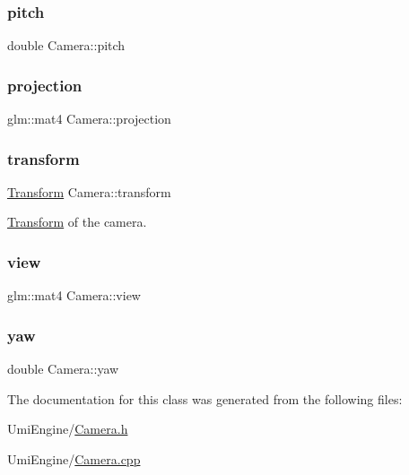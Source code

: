\subsubsection{\texorpdfstring{pitch}{pitch}}
{\footnotesize\ttfamily double Camera\+::pitch\hspace{0.3cm}{\ttfamily [protected]}}

\mbox{\label{class_camera_a43555a0ae83f9ec696ee257e5fd48cf2}} 
\subsubsection{\texorpdfstring{projection}{projection}}
{\footnotesize\ttfamily glm\+::mat4 Camera\+::projection\hspace{0.3cm}{\ttfamily [protected]}}

\mbox{\label{class_camera_ad5cea63239e1519c1fe7d414f5e047a8}} 
\subsubsection{\texorpdfstring{transform}{transform}}
{\footnotesize\ttfamily \mbox{\hyperlink{class_transform}{Transform}} Camera\+::transform}



\mbox{\hyperlink{class_transform}{Transform}} of the camera. 

\mbox{\label{class_camera_add93fedd6b9a6a6e2c784aeda624de83}} 
\subsubsection{\texorpdfstring{view}{view}}
{\footnotesize\ttfamily glm\+::mat4 Camera\+::view\hspace{0.3cm}{\ttfamily [protected]}}

\mbox{\label{class_camera_a54536224732656e8f4a419cf11662d3e}} 
\subsubsection{\texorpdfstring{yaw}{yaw}}
{\footnotesize\ttfamily double Camera\+::yaw\hspace{0.3cm}{\ttfamily [protected]}}



The documentation for this class was generated from the following files\+:\begin{DoxyCompactItemize}
\item 
Umi\+Engine/\mbox{\hyperlink{_camera_8h}{Camera.\+h}}\item 
Umi\+Engine/\mbox{\hyperlink{_camera_8cpp}{Camera.\+cpp}}\end{DoxyCompactItemize}
